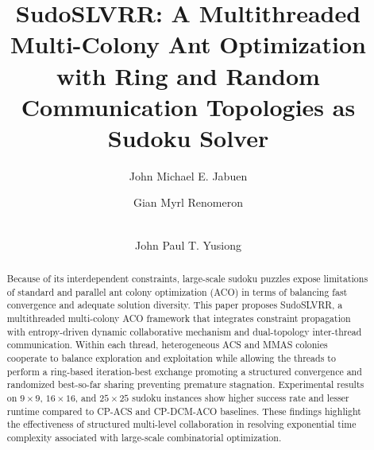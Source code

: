 \documentclass[runningheads]{llncs}
\begin{document}
%
\title{SudoSLVRR: A Multithreaded Multi-Colony Ant Optimization with Ring and Random Communication Topologies as Sudoku Solver}
%
%
\author{John Michael E. Jabuen \and
Gian Myrl Renomeron \and \\John Paul T. Yusiong}


%
\maketitle              %
%
\begin{abstract}
    Because of its interdependent constraints, large-scale sudoku puzzles expose limitations of standard and parallel ant colony optimization (ACO) in terms of balancing fast convergence and adequate solution diversity. This paper proposes SudoSLVRR, a multithreaded multi-colony ACO framework that integrates constraint propagation with entropy-driven dynamic collaborative mechanism and dual-topology inter-thread communication. Within each thread, heterogeneous ACS and MMAS colonies cooperate to balance exploration and exploitation while allowing the threads to perform a ring-based iteration-best exchange promoting a structured convergence and randomized best-so-far sharing preventing premature stagnation. Experimental results on $9 \times 9$, $16 \times 16$, and $25 \times 25$ sudoku instances show higher success rate and lesser runtime compared to CP-ACS and CP-DCM-ACO baselines. These findings highlight the effectiveness of structured multi-level collaboration in resolving exponential time complexity associated with large-scale combinatorial optimization.
     

\end{abstract}
%
%
%



\end{document}
